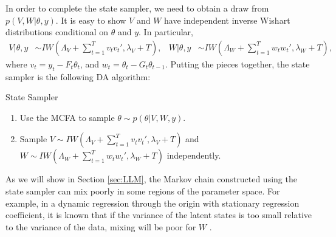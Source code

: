 \documentclass[12pt]{article}
\begin{document}
In order to complete the state sampler, we need to obtain a draw from $p(V,W|\theta,y)$. It is easy to show $V$ and $W$ have independent inverse Wishart distributions conditional on $\theta$ and $y$. In particular,
\begin{align*}
  V|\theta,y &\sim IW\left(\Lambda_V + \sum_{t=1}^Tv_tv_t',\lambda_V + T\right), &
  W|\theta,y &\sim IW\left(\Lambda_W + \sum_{t=1}^Tw_tw_t',\lambda_{W} + T\right), %
\end{align*}
where $v_t = y_t - F_t\theta_t$, and $w_t = \theta_t - G_t\theta_{t-1}$. Putting the pieces together, the state sampler is the following DA algorithm:
\begin{alg*}[State]State Sampler
\label{alg:DLMstate}
\begin{enumerate}
\item Use the MCFA to sample $\theta \sim p(\theta|V,W,y)$.
\item Sample $V \sim IW\left(\Lambda_V + \sum_{t=1}^Tv_tv_t',\lambda_V + T\right)$ and $W \sim IW\left(\Lambda_W + \sum_{t=1}^Tw_tw_t',\lambda_{W} + T\right)$ independently.
\end{enumerate}
\end{alg*}
\noindent As we will show in Section \ref{sec:LLM}, the Markov chain constructed using the state sampler can mix poorly in some regions of the parameter space. For example, in a dynamic regression through the origin with stationary regression coefficient, it is known that if the variance of the latent states is too small relative to the variance of the data, mixing will be poor for $W$ \citep{fruhwirth2004efficient}.
\end{document}
